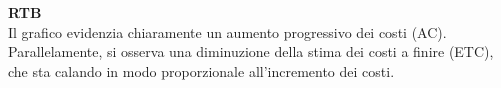\begin{flushleft}
\textbf{RTB} \\
Il grafico evidenzia chiaramente un aumento progressivo dei costi (AC). Parallelamente, si osserva una diminuzione della stima dei costi a finire (ETC), che sta calando in modo proporzionale all'incremento dei costi. \\
\end{flushleft}

\newpage
